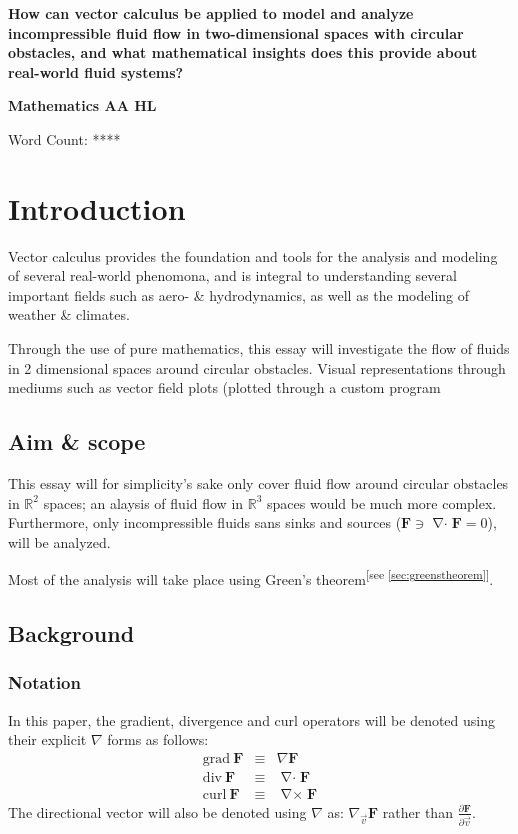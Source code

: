 \documentclass[a4paper,12pt]{article}
\newcommand{\fatf}{\mathbf{F}}         		%
\newcommand{\partialder}[2]{\frac{\partial #1}{\partial #2}}        %
\DeclareMathOperator{\divergence}{\nabla\cdot}
\DeclareMathOperator{\curl}{\nabla\times}
\newcommand{\referto}[1]{\textsuperscript{\color{darkgray}\tiny[see \ref{#1}]}}
\newcommand{\researchquestion}
{
	How can vector calculus be applied to model and analyze 
	incompressible fluid flow in two-dimensional spaces with 
	circular obstacles, and what mathematical insights
	does this provide about real-world fluid systems?
}
\begin{document}
\begin{titlepage}
	\begin{center}
		\vspace*{0.5cm}
		\Large\textbf{\researchquestion}

		\vspace{1.5cm}
		\large\textbf{Mathematics AA HL}

		\vfill
		\color{darkgray} Word Count: ****
	\end{center}
\end{titlepage}

\tableofcontents\newpage

\section{Introduction}
Vector calculus provides the foundation and tools for the analysis and modeling of several real-world phenomona, and is integral to understanding several important fields such as aero- \& hydrodynamics, as well as the modeling of weather \& climates. 

Through the use of pure mathematics, this essay will investigate the flow of fluids in 2 dimensional spaces around circular obstacles. Visual representations through mediums such as vector field plots (plotted through a custom program
\subsection{Aim \& scope}
This essay will for simplicity's sake only cover fluid flow around circular obstacles in $\mathbb{R}^2$ spaces; an alaysis of fluid flow in $\mathbb{R}^3$ spaces would be much more complex.
Furthermore, only incompressible fluids sans sinks and sources ($\fatf\ni\divergence\fatf=0$), will be analyzed.

Most of the analysis will take place using Green's theorem\referto{sec:greenstheorem}.

\subsection{Background}
\subsubsection{Notation}
In this paper, the gradient, divergence and curl operators will be denoted using their explicit $\nabla$ forms as follows:
$$\begin{matrix}
	\mathrm{grad}\ \fatf&\equiv&\nabla\fatf\\
	\mathrm{div}\ \fatf&\equiv&\divergence\fatf\\
	\mathrm{curl}\ \fatf&\equiv&\curl\fatf
\end{matrix}$$
The directional vector will also be denoted using $\nabla$ as: $\nabla_{\vec{v}}\fatf$ rather than $\partialder{\fatf}{\vec{v}}$.
\end{document}
